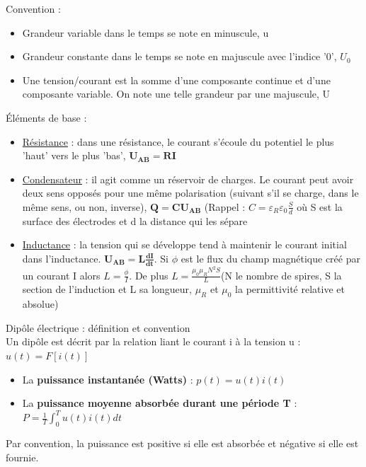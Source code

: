 \documentclass[../main.tex]{subfiles}
\begin{document}
Convention : \begin{itemize}
    \item Grandeur variable dans le temps se note en minuscule, u\\
    \item Grandeur constante dans le temps se note en majuscule avec l'indice '0', $U_0$\\
    \item Une tension/courant est la somme d'une composante continue et d'une composante variable. On note une telle grandeur par une majuscule, U
\end{itemize}

Éléments de base : \begin{itemize}
    \item \underline{Résistance} : dans une résistance, le courant s'écoule du potentiel le plus 'haut' vers le plus 'bas', $\mathbf{U_{AB} = RI}$\\
    \item \underline{Condensateur} : il agit comme un réservoir de charges. Le courant peut avoir deux sens opposés pour une même polarisation (suivant s'il se charge, dans le même sens, ou non, inverse), $\mathbf{Q = CU_{AB}}$ (Rappel : $C = \varepsilon_R \varepsilon_0 \frac{S}{d}$ où S est la surface des électrodes et d la distance qui les sépare\\
    \item \underline{Inductance} : la tension qui se développe tend à maintenir le courant initial dans l'inductance. $\mathbf{U_{AB} = L \frac{dI}{dt}}$. Si $\phi$ est le flux du champ magnétique créé par un courant I alors $L = \frac{\phi}{I}$. De plus $L = \frac{\mu_0 \mu_R N^2S}{L}$(N le nombre de spires, S la section de l'induction et L sa longueur, $\mu_R$ et $\mu_0$ la permittivité relative et absolue)\\
\end{itemize}

Dipôle électrique : définition et convention\\
Un dipôle est décrit par la relation liant le courant i à la tension u : $u(t) = F[i(t)]$\\
\begin{itemize}
    \item La \textbf{puissance instantanée (Watts)} : $p(t) = u(t)i(t)$\\
    \item La \textbf{puissance moyenne absorbée durant une période T} : $P = \frac{1}{T} \int_0^T u(t)i(t)dt$\\
\end{itemize}
\warning Par convention, la puissance est positive si elle est absorbée et négative si elle est fournie.\\
\end{document}
